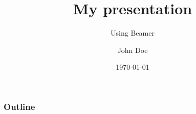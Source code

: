 \documentclass{beamer}
\title{My presentation}
\subtitle{Using Beamer}
\author{John Doe}
\institute{University of XXX}
\date{\today}
\begin{document}
	
	\begin{frame}
		\titlepage
	\end{frame}
	
	\begin{frame}
		\frametitle{Outline}
		\tableofcontents
	\end{frame}
\end{document}
